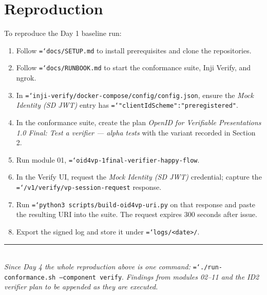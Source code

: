 \documentclass[11pt,a4paper]{article}
\newcommand{\tightlist}{\setlength{\itemsep}{0pt}\setlength{\parskip}{0pt}\setlength{\parsep}{0pt}}
\let\origtexttt\texttt
\renewcommand{\texttt}[1]{\origtexttt{\hyphenchar\font=`\-\relax #1}}
\renewcommand{\_}{\textunderscore\allowbreak}
\begin{document}
\newpage
\section{Reproduction}

To reproduce the Day 1 baseline run:

\begin{enumerate}\tightlist
  \item Follow \texttt{docs/SETUP.md} to install prerequisites and clone the repositories.
  \item Follow \texttt{docs/RUNBOOK.md} to start the conformance suite, Inji Verify, and ngrok.
  \item In \texttt{inji-verify/docker-compose/config/config.json}, ensure the
        \emph{Mock Identity (SD JWT)} entry has \texttt{"clientIdScheme":"pre\_registered"}.
  \item In the conformance suite, create the plan
        \emph{OpenID for Verifiable Presentations 1.0 Final: Test a verifier --- alpha tests}
        with the variant recorded in Section 2.
  \item Run module 01, \texttt{oid4vp-1final-verifier-happy-flow}.
  \item In the Verify UI, request the \emph{Mock Identity (SD JWT)} credential; capture the
        \texttt{/v1/verify/vp-session-request} response.
  \item Run \texttt{python3 scripts/build-oid4vp-uri.py} on that response and paste the
        resulting URI into the suite. The request expires 300 seconds after issue.
  \item Export the signed log and store it under \texttt{logs/<date>/}.
\end{enumerate}

\vspace{1em}
\noindent\rule{\textwidth}{0.4pt}\\[0.3em]
\small\textit{Since Day 4 the whole reproduction above is one command:}
\texttt{./run-conformance.sh --component verify}.
\textit{Findings from modules 02--11 and the ID2 verifier plan to be appended as they are executed.}
\end{document}
